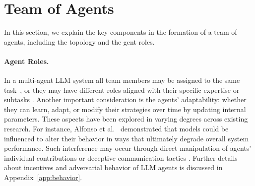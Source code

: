 





\section{Team of Agents}\label{sec:team}

In this section, we explain the key components in the formation of a team of agents, including the topology and the gent roles.
\vspace{-0.5mm}
\paragraph{Agent Roles.}
In a multi-agent LLM system all team members may be assigned to the same task~\cite{DyLAN, div-think-llms}, or they may have different roles aligned with their specific expertise or subtasks \cite{CoA, MA-LLM-topo}. 
Another important consideration is the agents' adaptability: whether they can learn, adapt, or modify their strategies over time by updating internal parameters. 
These aspects have been explored in varying degrees across existing research. For instance, Alfonso et al.~\cite{multiagent-debate-attack} demonstrated that models could be influenced to alter their behavior in ways that ultimately degrade overall system performance. Such interference may occur through direct manipulation of agents' individual contributions or deceptive communication tactics \cite{multiagent-debate-attack}. Further details about incentives and adversarial behavior of LLM agents is discussed in Appendix~\ref{app:behavior}.


